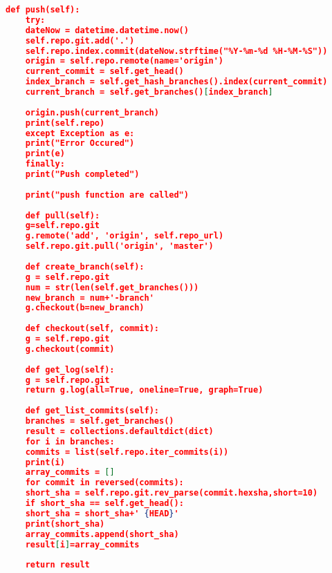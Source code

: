 \begin{lstlisting}[frame=single,tabsize=2,breaklines,caption={Kode sumber ApplicationRepo.py},label=applicationrepo, captionpos=b, language=json]
	def push(self):
	try:
	dateNow = datetime.datetime.now()
	self.repo.git.add('.')
	self.repo.index.commit(dateNow.strftime("%Y-%m-%d %H-%M-%S"))
	origin = self.repo.remote(name='origin')
	current_commit = self.get_head()
	index_branch = self.get_hash_branches().index(current_commit)
	current_branch = self.get_branches()[index_branch]
	
	origin.push(current_branch)
	print(self.repo)
	except Exception as e:
	print("Error Occured")
	print(e)
	finally:
	print("Push completed")
	
	print("push function are called")
	
	def pull(self):
	g=self.repo.git
	g.remote('add', 'origin', self.repo_url)
	self.repo.git.pull('origin', 'master')
	
	def create_branch(self):
	g = self.repo.git
	num = str(len(self.get_branches()))
	new_branch = num+'-branch'
	g.checkout(b=new_branch)
	
	def checkout(self, commit):
	g = self.repo.git
	g.checkout(commit)
	
	def get_log(self):
	g = self.repo.git
	return g.log(all=True, oneline=True, graph=True)
	
	def get_list_commits(self):
	branches = self.get_branches()
	result = collections.defaultdict(dict)
	for i in branches:
	commits = list(self.repo.iter_commits(i))
	print(i)
	array_commits = []
	for commit in reversed(commits):
	short_sha = self.repo.git.rev_parse(commit.hexsha,short=10)
	if short_sha == self.get_head():
	short_sha = short_sha+' {HEAD}'
	print(short_sha)
	array_commits.append(short_sha)
	result[i]=array_commits
	
	return result
	
	\end{lstlisting}
	
